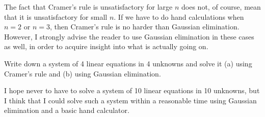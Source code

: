 The fact that Cramer's rule is unsatisfactory for large $n$ does not, of course, mean that it is unsatisfactory for small $n$. If we have to do hand
calculations when $n = 2$ or $n = 3$, then Cramer's rule is no harder than Gaussian elimination. However, I strongly advise the reader to use Gaussian
elimination in these cases as well, in order to acquire insight into what is actually going on.

\begin{exercise}
Write down a system of 4 linear equations in 4 unknowns and solve it (a) using Cramer's rule and (b) using Gaussian elimination.
\end{exercise}

I hope never to have to solve a system of 10 linear equations in 10 unknowns, but I think that I could solve such a system within a reasonable time using Gaussian elimination and a basic hand calculator. 
